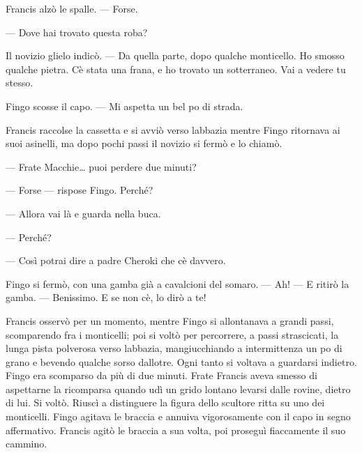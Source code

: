 Francis alzò le spalle. --- Forse.

--- Dove hai trovato questa roba?

Il novizio glielo indicò. --- Da quella parte, dopo qualche monticello.
Ho smosso qualche pietra. C\textquotesingle è stata una frana, e ho
trovato un sotterraneo. Vai a vedere tu stesso.

Fingo scosse il capo. --- Mi aspetta un bel po\textquotesingle{} di
strada.

Francis raccolse la cassetta e si avviò verso l\textquotesingle abbazia
mentre Fingo ritornava ai suoi asinelli, ma dopo pochi passi il novizio
si fermò e lo chiamò.

--- Frate Macchie\ldots{} puoi perdere due minuti?

--- Forse --- rispose Fingo. Perché?

--- Allora vai là e guarda nella buca.

--- Perché?

--- Così potrai dire a padre Cheroki che c\textquotesingle è davvero.

Fingo si fermò, con una gamba già a cavalcioni del somaro. --- Ah! --- E
ritirò la gamba. --- Benissimo. E se non c\textquotesingle è, lo dirò a
te!

Francis osservò per un momento, mentre Fingo si allontanava a grandi
passi, scomparendo fra i monticelli; poi si voltò per percorrere, a
passi strascicati, la lunga pista polverosa verso
l\textquotesingle abbazia, mangiucchiando a intermittenza un
po\textquotesingle{} di grano e bevendo qualche sorso
dall\textquotesingle otre. Ogni tanto si voltava a guardarsi indietro.
Fingo era scomparso da più di due minuti. Frate Francis aveva smesso di
aspettarne la ricomparsa quando udì un grido lontano levarsi dalle
rovine, dietro di lui. Si voltò. Riuscì a distinguere la figura dello
scultore ritta su uno dei monticelli. Fingo agitava le braccia e annuiva
vigorosamente con il capo in segno affermativo. Francis agitò le braccia
a sua volta, poi proseguì fiaccamente il suo cammino.

